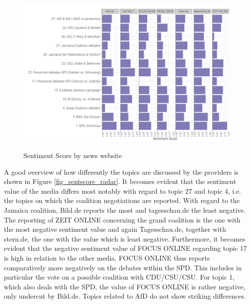 \documentclass[12pt,a4paper,notitlepage]{article}
\begin{document}
\begin{figure}[H]
	\caption{Sentiment Score by news website}
	\begin{center}
			\includegraphics[width=\textwidth,keepaspectratio]{figs/sentscore_site.png}
			\label{fig_sentscore_site}
	\end{center}
\end{figure}

A good overview of how differently the topics are discussed by the providers is shown in Figure \ref{fig_sentscore_radar}. It becomes evident that the sentiment value of the media differs most notably with regard to topic 27 and topic 4, i.e. the topics on which the coalition negotiations are reported. With regard to the Jamaica coalition, Bild.de reports the most and tagesschau.de the least negative. The reporting of ZEIT ONLINE concerning the grand coalition is the one with the most negative sentiment value and again Tagesschau.de, together with stern.de, the one with the value which is least negative. Furthermore, it becomes evident that the negative sentiment value of FOCUS ONLINE regarding topic 17 is high in relation to the other media. FOCUS ONLINE thus reports comparatively more negatively on the debates within the SPD. This includes in particular the vote on a possible coalition with CDU/CSU/CSU. For topic 1, which also deals with the SPD, the value of FOCUS ONLINE is rather negative, only undercut by Bild.de. Topics related to AfD do not show striking differences. 
\end{document}
